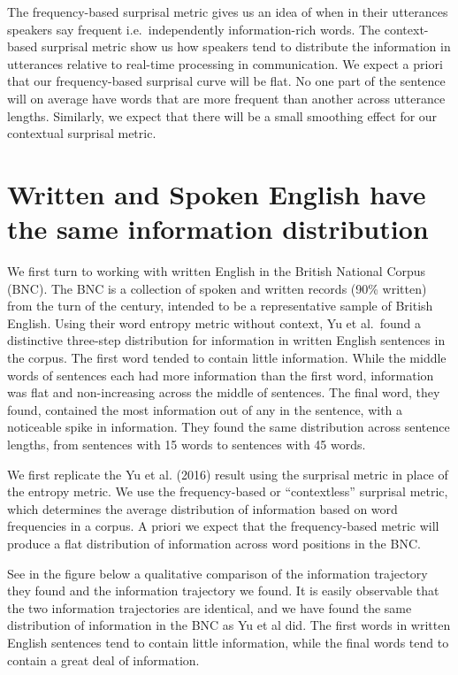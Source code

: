 \documentclass[11pt,]{article}
\begin{document}
The frequency-based surprisal metric gives us an idea of when in their utterances speakers say frequent i.e.~independently information-rich words. The context-based surprisal metric show us how speakers tend to distribute the information in utterances relative to real-time processing in communication. We expect a priori that our frequency-based surprisal curve will be flat. No one part of the sentence will on average have words that are more frequent than another across utterance lengths. Similarly, we expect that there will be a small smoothing effect for our contextual surprisal metric.

\hypertarget{written-and-spoken-english-have-the-same-information-distribution}{%
\section{Written and Spoken English have the same information distribution}\label{written-and-spoken-english-have-the-same-information-distribution}}

We first turn to working with written English in the British National Corpus (BNC). The BNC is a collection of spoken and written records (90\% written) from the turn of the century, intended to be a representative sample of British English. Using their word entropy metric without context, Yu et al.~found a distinctive three-step distribution for information in written English sentences in the corpus. The first word tended to contain little information. While the middle words of sentences each had more information than the first word, information was flat and non-increasing across the middle of sentences. The final word, they found, contained the most information out of any in the sentence, with a noticeable spike in information. They found the same distribution across sentence lengths, from sentences with 15 words to sentences with 45 words.

We first replicate the Yu et al. (2016) result using the surprisal metric in place of the entropy metric. We use the frequency-based or ``contextless'' surprisal metric, which determines the average distribution of information based on word frequencies in a corpus. A priori we expect that the frequency-based metric will produce a flat distribution of information across word positions in the BNC.

See in the figure below a qualitative comparison of the information trajectory they found and the information trajectory we found. It is easily observable that the two information trajectories are identical, and we have found the same distribution of information in the BNC as Yu et al did. The first words in written English sentences tend to contain little information, while the final words tend to contain a great deal of information.
\end{document}
